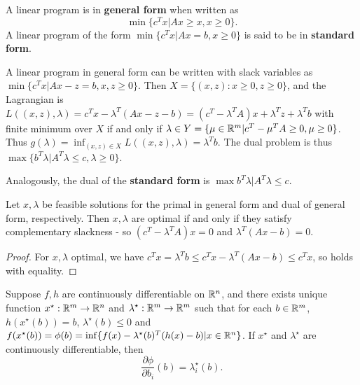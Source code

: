 \begin{defn}
  \label{sec:linear-programming-3}
  A linear program is in \textbf{general form} when written as
  \begin{equation}
    \min
    \{ c^{T} x | Ax \geq x, x \geq 0 \}.\label{eq:11}
  \end{equation}
  A linear program of the form $\min \{ c^{T}x | Ax = b, x \geq 0 \} $
  is said to be in \textbf{standard form}.
\end{defn}

\begin{thm}
  \label{sec:linear-programming-4}
  A linear program in general form can be written with slack variables
  as $\min \{ c^{T} x | Ax - z = b, x, z \geq 0 \} $. Then $X = \{ (x,
  z) : x \geq 0, z \geq 0 \} $, and the Lagrangian is $L((x, z),
  \lambda) = c^{T} x - \lambda^{T}(Ax - z - b) = (c^{T} - \lambda^{T}
  A)x + \lambda^{T} z + \lambda^{T}b$ with finite minimum over $X$ if
  and only if $\lambda \in Y = \{ \mu \in \mathbb{R}^{m} | c^{T}- \mu^{T} A
  \geq 0, \mu \geq 0 \} $. Thus $g(\lambda) = \inf_{(x, z) \in X}
  L((x, z), \lambda) = \lambda^{T} b$. The dual problem is thus $\max
  \{ b^{T} \lambda | A^{T} \lambda \leq c, \lambda \geq 0 \}$.

  Analogously, the dual of the \textbf{standard form} is $\max b^{T}
  \lambda | A^{T} \lambda \leq c$.
\end{thm}

\begin{thm}
  \label{sec:linear-programming-5}
  Let $x, \lambda$ be feasible solutions for the primal in general
  form and dual of general form, respectively.  Then $x, \lambda$ are
  optimal if and only if they satisfy complementary slackness - so
  $(c^{T} - \lambda^{T} A) x = 0$ and $\lambda^{T}(Ax - b) = 0$.
\end{thm}

\begin{proof}
  For $x, \lambda$ optimal, we have $c^{T} x = \lambda^{T} b \leq
  c^{T}x - \lambda^{T}(Ax - b) \leq c^{T} x$, so holds with equality.
\end{proof}

\begin{thm}
  \label{sec:linear-programming-6}
  Suppose $f, h$ are continuously differentiable on $\mathbb{R}^{n}$, and
  there exists unique function $x^{\star}: \mathbb{R}^{m} \rightarrow \mathbb{R}^{n}$
  and $\lambda^{\star}: \mathbb{R}^{m} \rightarrow \mathbb{R}^{m}$ such that for each
  $b \in \mathbb{R}^{m}$, $h(x^{\star}(b)) = b$, $\lambda^{\star}(b) \leq 0$
  and $f(x^{\star}(b)) = \phi(b) = \inf \{ f(x) -
  \lambda^{\star}(b)^{T}(h(x) - b) | x \in \mathbb{R}^{n}\} $.  If $x^{\star}$
  and $\lambda^{\star}$ are continuously differentiable, then
  \begin{equation}
    \label{eq:3}
    \frac{\partial \phi}{\partial b_{i}} (b) = \lambda^{\star}_{i}(b).
  \end{equation}
\end{thm}

